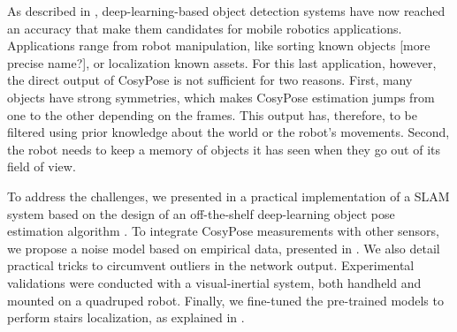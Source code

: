 

As described in , deep-learning-based object detection systems have now reached an accuracy that make them candidates for mobile robotics applications.
Applications range from robot manipulation, like sorting known objects [more precise name?], or localization \wrt known assets. For this last application, however,
the direct output of CosyPose is not sufficient for two reasons. First, many objects have strong symmetries, which makes CosyPose estimation jumps from one to the other
depending on the frames. This output has, therefore, to be filtered using prior knowledge about the world or the robot's movements. Second, the robot needs to keep
a memory of objects it has seen when they go out of its field of view.

To address the challenges, we presented in \cite{debeunne2021cosyslam} a practical implementation of a SLAM system based on the design of an off-the-shelf 
deep-learning object pose estimation algorithm \cite{labbe2020cosypose}. To integrate CosyPose measurements with other sensors, we propose a noise model based 
on empirical data, presented in . We also detail practical tricks to circumvent outliers in the network output. 
Experimental validations were conducted with a visual-inertial system, both handheld and mounted on a quadruped robot. Finally, we fine-tuned the pre-trained models 
to perform stairs localization, as explained in . 






